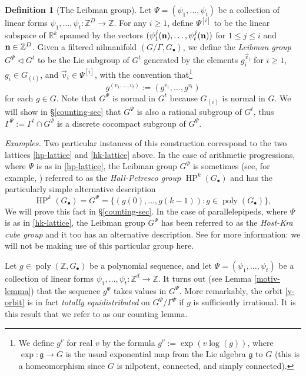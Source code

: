 \documentclass[11pt,reqno]{amsart}
\numberwithin{equation}{section}
\theoremstyle{plain}
\theoremstyle{definition}
\newtheorem{definition}[subsection]{Definition}
\renewcommand{\leq}{\leqslant}
\renewcommand{\geq}{\geqslant}
\newcommand\Z{\mathbb{Z}}
\newcommand\R{\mathbb{R}}
\newcommand\1{{\bf 1}}
\newcommand\2{{\bf 2}}
\newcommand\HP{\operatorname{HP}}
\newcommand\poly{\operatorname{poly}}
\begin{document}
\begin{definition}[The Leibman group]\label{leib-gp}  Let $\Psi = (\psi_1,\ldots,\psi_t)$ be a collection of linear forms $\psi_1,\ldots,\psi_t: \Z^D \to \Z$.  For any $i \geq 1$, define $\Psi^{[i]}$ to be the linear subspace of $\R^k$ spanned by the vectors $(\psi_1^j({\bf n}),\ldots,\psi_t^j({\bf n}))$ for $1 \leq j \leq i$ and ${\bf n} \in \Z^D$. Given a filtered nilmanifold $(G/\Gamma, G_\bullet)$, we define the \emph{Leibman group} $G^{\Psi} \lhd G^t$ to be the Lie subgroup of $G^t$ generated by the elements $g_i^{\vec v_i}$ for $i \geq 1$, $g_i \in G_{(i)}$, and $\vec v_i \in {\Psi}^{[i]}$, with the convention that\footnote{We define $g^v$ for real $v$ by the formula $g^v := \exp( v \log(g) )$, where $\exp: {\mathfrak g} \to G$ is the usual exponential map from the Lie algebra ${\mathfrak g}$ to $G$ (this is a homeomorphism since $G$ is nilpotent, connected, and simply connected).}
$$ g^{(v_1,\ldots,v_t)} := (g^{v_1},\ldots,g^{v_t})$$ 
for each $g \in G$.  Note that $G^{\Psi}$ is normal in $G^t$ because $G_{(i)}$ is normal in $G$.
We will show in \S \ref{counting-sec} that $G^{\Psi}$ is also a rational subgroup of $G^t$, thus $\Gamma^{\Psi} := \Gamma^t \cap G^{\Psi}$ is a discrete cocompact subgroup of $G^{\Psi}$.
\end{definition}

\emph{Examples. }Two particular instances of this construction correspond to the two lattices \eqref{hp-lattice} and \eqref{hk-lattice} above. In the case of arithmetic progressions, where $\Psi$ is as in \eqref{hp-lattice}, the Leibman group $G^{\Psi}$ is sometimes (see, for example, \cite{furst-erdos}) referred to as the \emph{Hall-Petresco group} $\HP^k(G_{\bullet})$ and has the particularly simple alternative description
\[ \HP^k(G_{\bullet}) = G^{\Psi} = \{ (g(0),\dots, g(k-1)) : g \in \poly(G_{\bullet})\},\] 
We will prove this fact in \S \ref{counting-sec}. 
In the case of parallelepipeds, where $\Psi$ is as in \eqref{hk-lattice}, the Leibman group $G^{\Psi}$ has been referred to as the \emph{Host-Kra cube group} \cite{green-tao-linearprimes} and it too has an alternative description. See \cite[Appendix E]{green-tao-linearprimes} for more information: we will not be making use of this particular group here.

Let $g \in \poly(\Z, G_\bullet)$ be a polynomial sequence, and let $\Psi = (\psi_1,\ldots,\psi_t)$ be a collection of linear forms $\psi_1,\ldots,\psi_t: \Z^d \to \Z$.  It turns out (see Lemma \ref{motiv-lemma}) that the sequence $g^\Psi$ takes values in $G^\Psi$.  More remarkably,  the orbit \eqref{v-orbit} is in fact \emph{totally equidistributed} on $G^{\Psi}/\Gamma^{\Psi}$ if $g$ is sufficiently irrational. It is this result that we refer to as our counting lemma.
\end{document}
